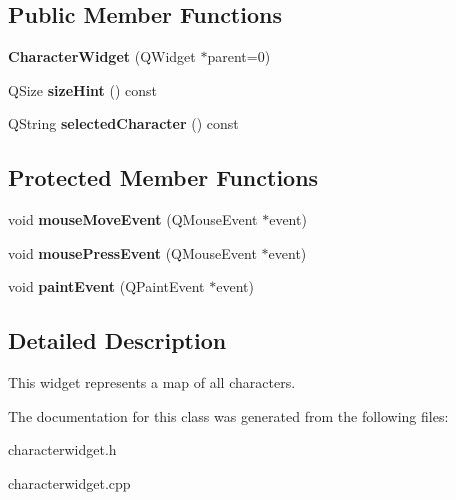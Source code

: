 \subsection*{Public Member Functions}
\begin{DoxyCompactItemize}
\item 
\hypertarget{class_character_widget_a7119822e95f485b2c2677bfb04326633}{
{\bfseries CharacterWidget} (QWidget $\ast$parent=0)}
\label{class_character_widget_a7119822e95f485b2c2677bfb04326633}

\item 
\hypertarget{class_character_widget_a63add0d03eaa81495ef5666e0ad110ea}{
QSize {\bfseries sizeHint} () const }
\label{class_character_widget_a63add0d03eaa81495ef5666e0ad110ea}

\item 
\hypertarget{class_character_widget_a1190f034e32e1dcd0bd8b41de7854e17}{
QString {\bfseries selectedCharacter} () const }
\label{class_character_widget_a1190f034e32e1dcd0bd8b41de7854e17}

\end{DoxyCompactItemize}
\subsection*{Protected Member Functions}
\begin{DoxyCompactItemize}
\item 
\hypertarget{class_character_widget_ad71f661538e4d4a35f12190463baed06}{
void {\bfseries mouseMoveEvent} (QMouseEvent $\ast$event)}
\label{class_character_widget_ad71f661538e4d4a35f12190463baed06}

\item 
\hypertarget{class_character_widget_a63cdfa9a0b156cc85704ddca938ecc63}{
void {\bfseries mousePressEvent} (QMouseEvent $\ast$event)}
\label{class_character_widget_a63cdfa9a0b156cc85704ddca938ecc63}

\item 
\hypertarget{class_character_widget_a91dea86898eefe1ea7e57c78f9e927d5}{
void {\bfseries paintEvent} (QPaintEvent $\ast$event)}
\label{class_character_widget_a91dea86898eefe1ea7e57c78f9e927d5}

\end{DoxyCompactItemize}


\subsection{Detailed Description}
This widget represents a map of all characters. 

The documentation for this class was generated from the following files:\begin{DoxyCompactItemize}
\item 
characterwidget.h\item 
characterwidget.cpp\end{DoxyCompactItemize}
